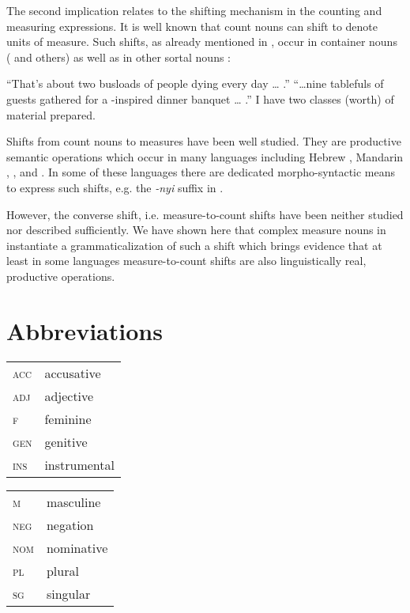 \documentclass[output=paper,
colorlinks,
citecolor=brown,
newtxmath
]{langscibook}
\begin{document}
\noindent The second implication relates to the shifting mechanism in the counting and measuring expressions. It is well known that count nouns can shift to denote units of measure. Such shifts, as already mentioned in , occur in container nouns (\citealt{Doetjes1997,Landman2004,Rothstein2009} and others) as well as in other sortal nouns  \citep{Rothstein2017}:

    \largerpage %

\ea\label{ex:khrizmann:44}
    \ea ``That's about two busloads of people dying every day {\dots} .''
    \ex ``\dots nine tablefuls of guests gathered for a -inspired dinner banquet {\dots} .''
    \ex I have two classes (worth) of material prepared. \hfill \citep[216f.]{Rothstein2017}
\z\z

\noindent Shifts from count nouns to measures have been well studied. They are productive semantic operations which occur in many languages including Hebrew \citep{Rothstein2009}, Mandarin \citep{Li2013},  \citep{Schvarcz2014}, and  \citep{Partee.Borschev2012,Khrizman2016,Khrizman2016b}. In some of these languages there are dedicated morpho-syntactic means to express such shifts, e.g. the \textit{-nyi} suffix in  \citep{Schvarcz2014,Schvarcz2017}.

However, the converse shift, i.e. measure-to-count shifts have been neither studied nor described sufficiently. We have shown here that complex measure nouns in  instantiate a grammaticalization of such a shift which brings evidence that at least in some languages measure-to-count shifts are also linguistically real, productive operations.


\section*{Abbreviations}

\begin{tabularx}{.5\textwidth}{@{}lX@{}}
\textsc{acc}& accusative\\
\textsc{adj}& adjective \\
\textsc{f}& feminine \\
\textsc{gen}& genitive \\
\textsc{ins}& instrumental \\
\end{tabularx}%
\begin{tabularx}{.5\textwidth}{@{}lX@{}}
\textsc{m}& masculine \\
\textsc{neg}& negation \\
\textsc{nom}& nominative \\
\textsc{pl}& plural \\
\textsc{sg}& singular \\
\end{tabularx}
\end{document}
